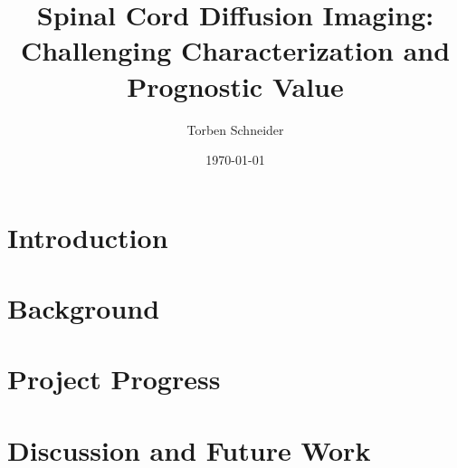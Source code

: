 \documentclass[a4paper]{scrreprt}
\begin{document}
 
\title{Spinal Cord Diffusion Imaging: Challenging Characterization and Prognostic Value} 
\date{\today} 
\author{Torben Schneider} 
\maketitle 
\chapter{Introduction}

\chapter{Background} 
 
\chapter{Project Progress}
 

\chapter{Discussion and Future Work}
	
\end{document}
